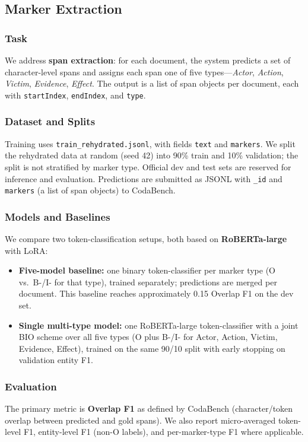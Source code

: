 
\subsection{Marker Extraction}

\subsubsection{Task}
We address \textbf{span extraction}: for each document, the system predicts a set of character-level spans and assigns each span one of five types---\textit{Actor}, \textit{Action}, \textit{Victim}, \textit{Evidence}, \textit{Effect}. The output is a list of span objects per document, each with \texttt{startIndex}, \texttt{endIndex}, and \texttt{type}.

\subsubsection{Dataset and Splits}
Training uses \texttt{train\_rehydrated.jsonl}, with fields \texttt{text} and \texttt{markers}. We split the rehydrated data at random (seed 42) into 90\% train and 10\% validation; the split is not stratified by marker type. Official dev and test sets are reserved for inference and evaluation. Predictions are submitted as JSONL with \texttt{\_id} and \texttt{markers} (a list of span objects) to CodaBench.

\subsubsection{Models and Baselines}
We compare two token-classification setups, both based on \textbf{RoBERTa-large} with LoRA:
\begin{itemize}
    \item \textbf{Five-model baseline:} one binary token-classifier per marker type (O vs.\ B-/I- for that type), trained separately; predictions are merged per document. This baseline reaches approximately 0.15 Overlap F1 on the dev set.
    \item \textbf{Single multi-type model:} one RoBERTa-large token-classifier with a joint BIO scheme over all five types (O plus B-/I- for Actor, Action, Victim, Evidence, Effect), trained on the same 90/10 split with early stopping on validation entity F1.
\end{itemize}

\subsubsection{Evaluation}
The primary metric is \textbf{Overlap F1} as defined by CodaBench (character/token overlap between predicted and gold spans). We also report micro-averaged token-level F1, entity-level F1 (non-O labels), and per-marker-type F1 where applicable.
